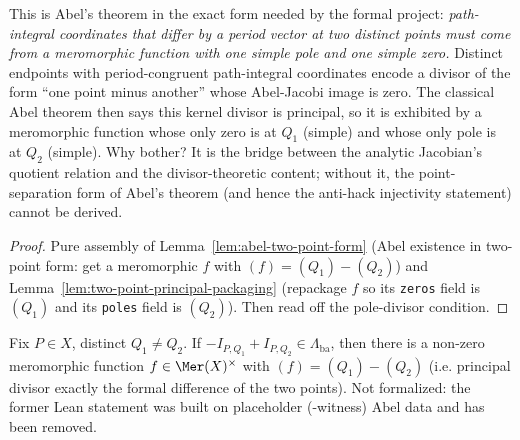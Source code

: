 \begin{layman}
This is Abel's theorem in the exact form needed by the formal
project: \emph{path-integral coordinates that differ by a period
vector at two distinct points must come from a meromorphic function
with one simple pole and one simple zero.} Distinct endpoints with
period-congruent path-integral coordinates encode a divisor of the
form ``one point minus another'' whose Abel-Jacobi image is zero.
The classical Abel theorem then says this kernel divisor is principal,
so it is exhibited by a meromorphic function whose only zero is at
\(Q_1\) (simple) and whose only pole is at \(Q_2\) (simple). Why
bother? It is the bridge between the analytic Jacobian's quotient
relation and the divisor-theoretic content; without it, the
point-separation form of Abel's theorem (and hence the anti-hack
injectivity statement) cannot be derived.
\end{layman}

\begin{proof}
Pure assembly of Lemma~\ref{lem:abel-two-point-form}
(Abel existence in two-point form: get a meromorphic \(f\) with
\((f) = (Q_1) - (Q_2)\)) and
Lemma~\ref{lem:two-point-principal-packaging}
(repackage \(f\) so its \texttt{zeros} field is \((Q_1)\) and its
\texttt{poles} field is \((Q_2)\)). Then read off the pole-divisor
condition.
\end{proof}


\begin{lemma}
\label{lem:abel-two-point-form}
Fix \(P\in X\), distinct \(Q_1\neq Q_2\). If
\(-I_{P,Q_1} + I_{P,Q_2} \in \Lambda_{\mathrm{ba}}\), then there is a
non-zero meromorphic function \(f\in\Mer(X)^\times\) with
\((f) = (Q_1) - (Q_2)\) (i.e. principal divisor exactly the formal
difference of the two points).
Not formalized: the former Lean statement was built on placeholder
(-witness) Abel data and has been removed.
\end{lemma}

